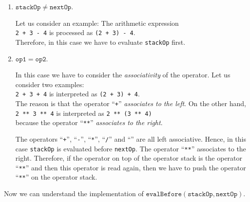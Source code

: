 \begin{enumerate}
\item $\mathtt{stackOp} \not= \mathtt{nextOp}$.

      Let us consider an example:  The arithmetic expression 
      \\[0.2cm]
      \hspace*{1.3cm} 
      \texttt{2 + 3 - 4} \quad is processed as \quad \texttt{(2 + 3) - 4}. 
      \\[0.2cm]
      Therefore, in this case we have to evaluate \texttt{stackOp} first.
\item $\mathtt{op1} = \mathtt{op2}$.

      In this case we have to consider the \emph{associativity} of the operator.
      Let us consider two examples: \\[0.2cm]
      \hspace*{1.3cm} \texttt{2 + 3 + 4} \quad is interpreted as \quad \texttt{(2 + 3) + 4}. \\[0.2cm]
      The reason is that the operator ``\texttt{+}'' \emph{associates to the left}.
      On the other hand, \\[0.2cm]
      \hspace*{1.3cm} 
      \texttt{2 \texttt{**} 3 \texttt{**} 4}  \quad is interpreted as \quad \texttt{2 \texttt{**} (3 \texttt{**} 4)}
      \\[0.2cm]
      because the operator ``\texttt{**}'' \emph{associates to the right}.

      The operators ``\texttt{+}'', ``\texttt{-}'', ``\texttt{*}'', ``\texttt{/}'' and 
      ``\texttt{}'' are all left associative.  Hence, in this case \texttt{stackOp} is
      evaluated before \texttt{nextOp}.
      The operator ``\texttt{**}'' associates to the right. Therefore, if
      the operator on top of the operator stack is the operator ``\texttt{**}'' and then this operator
      is read again, then we have to push the  operator ``\texttt{**}'' on the operator stack.
\end{enumerate}
Now we can understand the implementation of $\texttt{evalBefore}(\mathtt{stackOp},\mathtt{nextOp})$.

